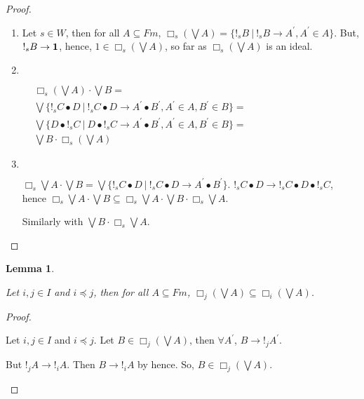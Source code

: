 \documentclass[a4paper]{article}
\newtheorem{lemma}{Lemma}
\begin{document}
\begin{proof}
  \begin{enumerate}
    \item Let $s \in W$, then for all $A \subseteq Fm$, $\Box_s (\bigvee A) = \{ !_s B \: | \: !_s B \rightarrow A^{'}, A^{'} \in A \}$.
    But, $!_s B \rightarrow {\bf 1}$, hence, $1 \in \Box_s (\bigvee A)$, so far as $\Box_s (\bigvee A)$ is an ideal.
    \item  $ $

    $\begin{array}{lll}
    &\Box_s (\bigvee A) \cdot \bigvee B = & \\
    &\bigvee \{ !_s C \bullet D \: | \: !_s C \bullet D \rightarrow A^{'} \bullet B^{'}, A^{'} \in A, B^{'} \in B \} = & \\
    &\bigvee \{ D \bullet !_s C \: | \: D \bullet !_s C \rightarrow A^{'} \bullet B^{'}, A^{'} \in A, B^{'} \in B \} = & \\
    &\bigvee B \cdot \Box_s (\bigvee A)&
    \end{array}$

    \item $ $

    $\Box_s \bigvee A \cdot \bigvee B = \bigvee \{ !_s C \bullet D \: | \: !_s C \bullet D \rightarrow A^{'} \bullet B^{'}\}$.
    $!_s C \bullet D \rightarrow !_s C \bullet D \bullet !_s C$, hence $\Box_s \bigvee A \cdot \bigvee B \subseteq \Box_s \bigvee A \cdot \bigvee B \cdot \Box_s \bigvee A$.

    Similarly with $\bigvee B \cdot \Box_s \bigvee A$.
  \end{enumerate}
\end{proof}

\begin{lemma}
$ $

  Let $i, j \in I$ and $i \preceq j$, then for all $A \subseteq Fm$, $\Box_j (\bigvee A) \subseteq \Box_i (\bigvee A)$.
\end{lemma}

\begin{proof}
  \begin{enumerate}

    Let $i, j \in I$ and $i \preceq j$. Let $B \in \Box_j (\bigvee A)$, then $\forall A^{'}$, $B \rightarrow !_j A^{'}$.

    But $!_j A \rightarrow !_i A$. Then $B \rightarrow !_i A$ by hence. So, $B \in \Box_j (\bigvee A)$.
  \end{enumerate}
\end{proof}
\end{document}
